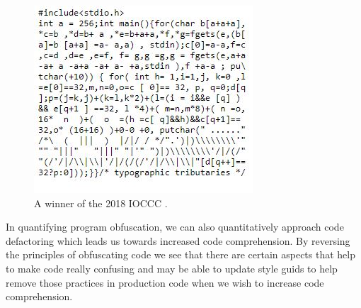\begin{figure}[!ht]
\scriptsize
\centering
\includegraphics[scale=1.0]{images/IOCCC}

\caption{A winner of the 2018 IOCCC \cite{noauthor_international_nodate}.}

\label{fig:IOCCC}
\end{figure}

In quantifying program obfuscation, we can also quantitatively approach code defactoring which leads us
towards increased code comprehension\cite{anckaert_program_2007, capiluppi_code_2012}. By reversing the
principles of obfuscating code we see that there are certain aspects that help to make
code really confusing and may be able to update style guids to help remove those practices in production
code when we wish to increase code comprehension. 